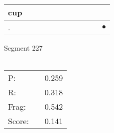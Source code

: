 \documentclass[landscape]{article}
\newcommand{\ssp}{\hspace{2pt}}
\newcommand{\mex}{\cellcolor{g}$\bullet$}
\begin{document}
\begin{tabular}{|l|p{10pt}|p{10pt}|p{10pt}|p{10pt}|p{10pt}|p{10pt}|p{10pt}|p{10pt}|p{10pt}|p{10pt}|}
\hline
\ssp cup \ssp&\hspace{2pt}&\hspace{2pt}&\hspace{2pt}&\hspace{2pt}&\hspace{2pt}&\hspace{2pt}&\hspace{2pt}&\hspace{2pt}&\hspace{2pt}&\hspace{2pt}\\
\hline
\ssp \cellcolor{ref9}. \ssp&\hspace{2pt}&\hspace{2pt}&\hspace{2pt}&\hspace{2pt}&\hspace{2pt}&\hspace{2pt}&\hspace{2pt}&\hspace{2pt}&\hspace{2pt}&\hspace{2pt}\mex\\
\hline
\end{tabular}

\vspace{6pt}
\noindent Segment 227\\\\
\noindent\begin{tabular}{lm{12pt}r}
\hline
P:&&0.259\\
R:&&0.318\\
Frag:&&0.542\\
Score:&&0.141\\
\end{tabular}

\newpage
\end{document}
